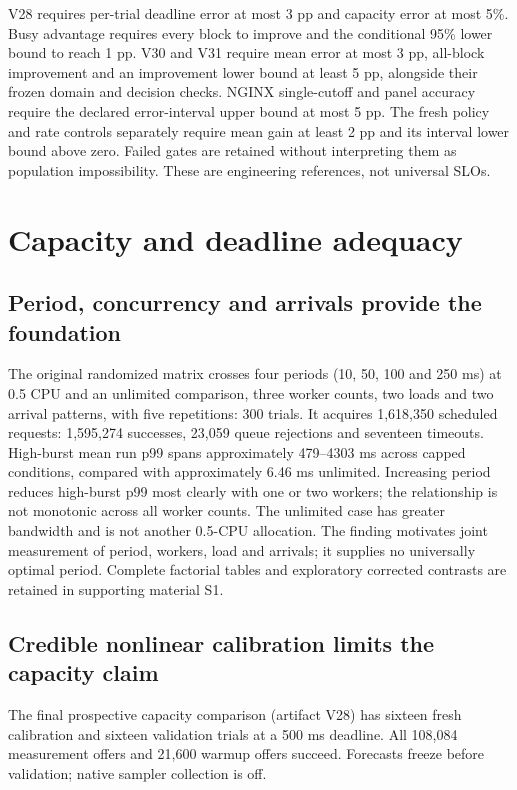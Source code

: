 \documentclass[10pt,a4paper]{article}
\begin{document}
V28 requires per-trial deadline error at most 3 pp and capacity error at most 5\%. Busy advantage requires every block to improve and the conditional 95\% lower bound to reach 1 pp. V30 and V31 require mean error at most 3 pp, all-block improvement and an improvement lower bound at least 5 pp, alongside their frozen domain and decision checks. NGINX single-cutoff and panel accuracy require the declared error-interval upper bound at most 5 pp. The fresh policy and rate controls separately require mean gain at least 2 pp and its interval lower bound above zero. Failed gates are retained without interpreting them as population impossibility. These are engineering references, not universal SLOs.

\section{Capacity and deadline adequacy}

\subsection{Period, concurrency and arrivals provide the foundation}

The original randomized matrix crosses four periods (10, 50, 100 and 250 ms) at 0.5 CPU and an unlimited comparison, three worker counts, two loads and two arrival patterns, with five repetitions: 300 trials. It acquires 1,618,350 scheduled requests: 1,595,274 successes, 23,059 queue rejections and seventeen timeouts. High-burst mean run p99 spans approximately 479–4303 ms across capped conditions, compared with approximately 6.46 ms unlimited. Increasing period reduces high-burst p99 most clearly with one or two workers; the relationship is not monotonic across all worker counts. The unlimited case has greater bandwidth and is not another 0.5-CPU allocation. The finding motivates joint measurement of period, workers, load and arrivals; it supplies no universally optimal period. Complete factorial tables and exploratory corrected contrasts are retained in supporting material S1.

\subsection{Credible nonlinear calibration limits the capacity claim}

The final prospective capacity comparison (artifact V28) has sixteen fresh calibration and sixteen validation trials at a 500 ms deadline. All 108,084 measurement offers and 21,600 warmup offers succeed. Forecasts freeze before validation; native sampler collection is off.
\end{document}
